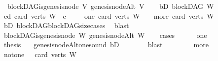\begin{isabellebody}
\ \ blockDAG{\isachardot}{\kern0pt}is{\isacharunderscore}{\kern0pt}genesis{\isacharunderscore}{\kern0pt}node\ V\ {\isacharparenleft}{\kern0pt}genesis{\isacharunderscore}{\kern0pt}nodeAlt\ V{\isacharparenright}{\kern0pt}{\isacharparenright}{\kern0pt}{\isachardoublequoteclose}\isanewline
\ \ \isamarkupfalse%
\ bD{\isacharcolon}{\kern0pt}\ {\isachardoublequoteopen}blockDAG\ W{\isachardoublequoteclose}\isanewline
\ \ \isamarkupfalse%
\ cd{\isacharcolon}{\kern0pt}\ {\isachardoublequoteopen}card\ {\isacharparenleft}{\kern0pt}verts\ W{\isacharparenright}{\kern0pt}\ {\isacharequal}{\kern0pt}\ c{\isachardoublequoteclose}\ \isanewline
\ \ \isamarkupfalse%
\ {\isacharparenleft}{\kern0pt}one{\isacharparenright}{\kern0pt}\ {\isachardoublequoteopen}card\ {\isacharparenleft}{\kern0pt}verts\ W{\isacharparenright}{\kern0pt}\ {\isacharequal}{\kern0pt}\ {}{\isachardoublequoteclose}\ {\isacharbar}{\kern0pt}\ {\isacharparenleft}{\kern0pt}more{\isacharparenright}{\kern0pt}\ {\isachardoublequoteopen}card\ {\isacharparenleft}{\kern0pt}verts\ W{\isacharparenright}{\kern0pt}\ {\isachargreater}{\kern0pt}\ {}{\isachardoublequoteclose}\isanewline
\ \ \ \ \isamarkupfalse%
\ bD\ blockDAG{\isachardot}{\kern0pt}blockDAG{\isacharunderscore}{\kern0pt}size{\isacharunderscore}{\kern0pt}cases\ \isamarkupfalse%
\ blast\isanewline
\ \ \isamarkupfalse%
\ \isamarkupfalse%
\ {\isachardoublequoteopen}blockDAG{\isachardot}{\kern0pt}is{\isacharunderscore}{\kern0pt}genesis{\isacharunderscore}{\kern0pt}node\ W\ {\isacharparenleft}{\kern0pt}genesis{\isacharunderscore}{\kern0pt}nodeAlt\ W{\isacharparenright}{\kern0pt}{\isachardoublequoteclose}\ \isanewline
\ \ \isamarkupfalse%
{\isacharparenleft}{\kern0pt}cases{\isacharparenright}{\kern0pt}\isanewline
\ \ \ \ \isamarkupfalse%
\ one\isanewline
\ \ \ \ \isamarkupfalse%
\ \isamarkupfalse%
\ {\isacharquery}{\kern0pt}thesis\ \ \isamarkupfalse%
\ genesis{\isacharunderscore}{\kern0pt}nodeAlt{\isacharunderscore}{\kern0pt}one{\isacharunderscore}{\kern0pt}sound\ bD\isanewline
\ \ \ \ \ \ \isamarkupfalse%
\ blast\isanewline
\ \ \isamarkupfalse%
\isanewline
\ \ \ \ \isamarkupfalse%
\ more\isanewline
\ \ \ \ \isamarkupfalse%
\ \isamarkupfalse%
\ not{\isacharunderscore}{\kern0pt}one{\isacharcolon}{\kern0pt}\ {\isachardoublequoteopen}{}\ {\isasymnoteq}\ card\ {\isacharparenleft}{\kern0pt}verts\ W{\isacharparenright}{\kern0pt}{\isachardoublequoteclose}\ \isamarkupfalse%

\end{isabellebody}
